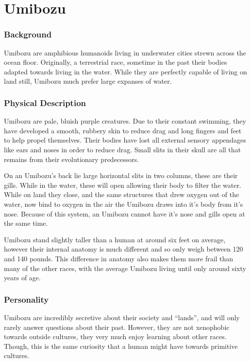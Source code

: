 \chapter*{Umibozu}

\subsection*{Background}

Umibozu are amphibious humanoids living in underwater cities strewn across the ocean floor. Originally, a terrestrial race, sometime in the past their bodies adapted towards living in the water. While they are perfectly capable of living on land still, Umibozu much prefer large expanses of water.

\subsection*{Physical Description}

Umibozu are pale, bluish purple creatures. Due to their constant swimming, they have developed a smooth, rubbery skin to reduce drag and long fingers and feet to help propel themselves. Their bodies have lost all external sensory appendages like ears and noses in order to reduce drag. Small slits in their skull are all that remains from their evolutionary predecessors.  

On an Umibozu’s back lie large horizontal slits in two columns, these are their gills. While in the water, these will open allowing their body to filter the water. While on land they close, and the same structures that drew oxygen out of the water, now bind to oxygen in the air the Umibozu draws into it’s body from it’s nose. Because of this system, an Umibozu cannot have it’s nose and gills open at the same time.

Umibozu stand slightly taller than a human at around six feet on average, however their internal anatomy is much different and so only weigh between 120 and 140 pounds. This difference in anatomy also makes them more frail than many of the other races, with the average Umibozu living until only around sixty years of age.

\subsection*{Personality}

Umibozu are incredibly secretive about their society and “lands”, and will only rarely answer questions about their past. However, they are not xenophobic towards outside cultures, they very much enjoy learning about other races. Though, this is the same curiosity that a human might have towards primitive cultures. 

